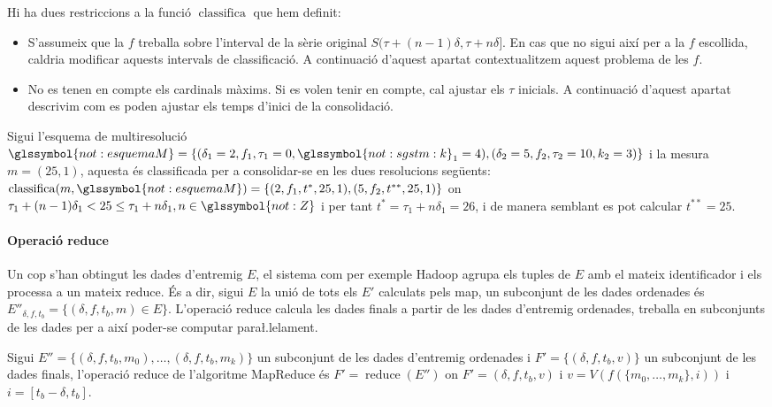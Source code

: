 Hi ha dues restriccions a la funció $\operatorname{classifica}$ que
hem definit: 
\begin{itemize}

\item S'assumeix que la $f$ treballa sobre l'interval de la sèrie
  original $S(\tau+(n-1)\delta ,\tau+n\delta]$. En cas que no sigui
  així per a la $f$ escollida, caldria modificar aquests intervals de
  classificació. A continuació d'aquest apartat contextualitzem aquest
  problema de les $f$.

\item No es tenen en compte els cardinals màxims. Si es volen tenir en
  compte, cal ajustar els $\tau$ inicials. A continuació d'aquest
  apartat descrivim com es poden ajustar els temps d'inici de la
  consolidació.

\end{itemize}



\begin{example}
  \label{ex:mapreduce:classifica}
  Sigui l'esquema de multiresolució
  $\glssymbol{not:esquemaM}=\{(\delta_1=2,f_1,\tau_1=0,\glssymbol{not:sgstm:k}_1=4),(\delta_2=5,f_2,\tau_2=10,k_2=3)\}$
  i la mesura $m=(25,1)$, aquesta és classificada per a consolidar-se
  en les dues resolucions següents:
  $\operatorname{classifica}(m,\glssymbol{not:esquemaM})=\{
  (2,f_1,t^*,25,1), (5,f_2,t^{**},25,1) \}$ on $\tau_1+(n-1)\delta_1 <
  25 \leq \tau_1+n\delta_1, n\in\glssymbol{not:Z}$ i per tant
  $t^*=\tau_1+n\delta_1 = 26$, i de manera semblant es pot calcular
  $t^{**}= 25$.
\end{example}




\paragraph{Operació reduce}
Un cop s'han obtingut les dades d'entremig $E$, el sistema com per
exemple Hadoop agrupa els tuples de $E$ amb el mateix identificador i
els processa a un mateix reduce. És a dir, sigui $E$ la unió de tots
els $E'$ calculats pels map, un subconjunt de les dades ordenades és
$E''_{\delta,f,t_b} = \{ (\delta,f,t_b,m) \in E \}$.  L'operació
reduce calcula les dades finals a partir de les dades d'entremig
ordenades, treballa en subconjunts de les dades per a així poder-se
computar para\l.lelament.
\begin{definition}
  Sigui $E''= \{ (\delta,f,t_b,m_0) ,\dotsc, (\delta,f,t_b,m_k) \}$ un
  subconjunt de les dades d'entremig ordenades i $F'=\{
  (\delta,f,t_b,v) \}$ un subconjunt de les dades finals, l'operació
  reduce de l'algoritme MapReduce és $F'=\operatorname{reduce}(E'')$
  on $F'= (\delta,f,t_b,v)$ i $v= V( f(\{m_0,\dotsc,m_k\},i))$ i
  $i=[t_b-\delta,t_b]$.
\end{definition}

